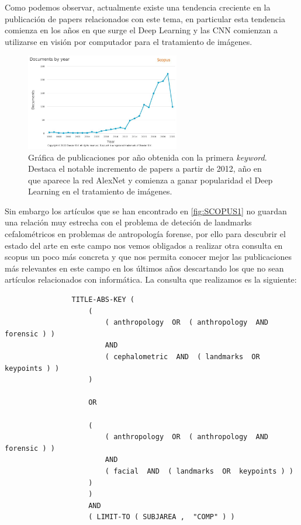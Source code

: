             \medskip
            
            \noindent Como podemos observar, actualmente existe una tendencia creciente en la publicación de papers relacionados con este tema, en particular esta tendencia comienza en los años en que surge el Deep Learning y las CNN comienzan a utilizarse en visión por computador para el tratamiento de imágenes. 

            \begin{figure}[!h]
                \centering
                \includegraphics[width=0.6\textwidth]{img/Scopus_1.jpg}
                \caption{Gráfica de publicaciones por año obtenida con la primera \textit{keyword}. Destaca el notable incremento de papers a partir de 2012, año en que aparece la red AlexNet y comienza a ganar popularidad el Deep Learning en el tratamiento de imágenes.}
                \label{fig:SCOPUS1}
            \end{figure}

            \medskip

            \noindent Sin embargo los artículos que se han encontrado en \autoref{fig:SCOPUS1} no guardan una relación muy estrecha con el problema de deteción de landmarks cefalométricos en problemas de antropología forense, por ello para descubrir el estado del arte en este campo nos vemos obligados a realizar otra consulta en scopus un poco más concreta y que nos permita conocer mejor las publicaciones más relevantes en este campo en los últimos años descartando los que no sean artículos relacionados con informática. La consulta que realizamos es la siguiente: 

            \begin{verbatim}
                TITLE-ABS-KEY ( 
                    ( 
                        ( anthropology  OR  ( anthropology  AND  forensic ) )  
                        AND  
                        ( cephalometric  AND  ( landmarks  OR  keypoints ) ) 
                    )  
                    
                    OR  
                    
                    ( 
                        ( anthropology  OR  ( anthropology  AND  forensic ) )  
                        AND  
                        ( facial  AND  ( landmarks  OR  keypoints ) ) 
                    ) 
                    )  
                    AND  
                    ( LIMIT-TO ( SUBJAREA ,  "COMP" ) )
            \end{verbatim}

